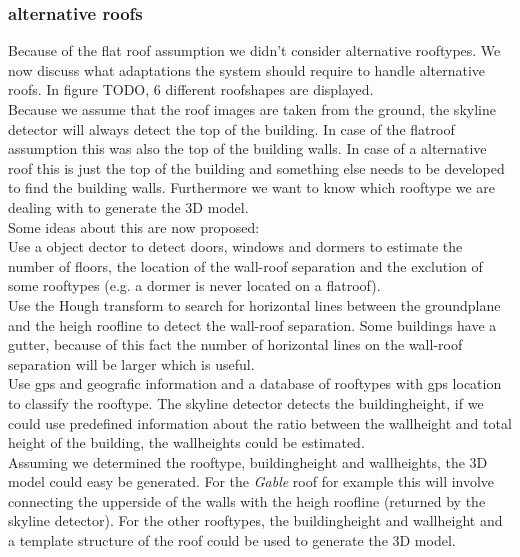 \documentclass[10pt]{article}
\begin{document}
\subsubsection{alternative roofs}


Because of the flat roof assumption we didn't consider alternative rooftypes.
We now discuss what adaptations the system should require to handle alternative roofs.
In figure TODO, 6 different roofshapes are displayed.\\
Because we assume that the roof images are taken from the ground, the skyline
detector will always detect the top of the building. In case of the flatroof
assumption this was also the top of the building walls.
In case of a alternative roof this is just the top of the building and something
else needs to be developed to find the building walls. Furthermore we want to
know which rooftype we are dealing with to generate the 3D model.\\
Some ideas about this are now proposed:\\
Use a object dector to detect doors, windows and dormers to estimate the
number of floors, the location of the wall-roof separation and the exclution of
some rooftypes (e.g. a dormer is never located on a flatroof).\\
Use the Hough transform to search for horizontal lines between the groundplane and the
heigh roofline to detect the wall-roof separation. Some buildings have a gutter,
because of this fact the number of horizontal lines on the wall-roof separation
will be larger which is useful.\\
Use gps and geografic information and a database of rooftypes with gps location
to classify the rooftype. The skyline detector detects the buildingheight, if we
could use predefined information about the ratio between the wallheight and
total height of the building, the wallheights could be estimated.\\
Assuming we determined the rooftype, buildingheight and wallheights, the 3D model could 
easy be generated. 
For the \emph{Gable} roof for example this will involve connecting the upperside of the
walls with the heigh roofline (returned by the skyline detector). For the other
rooftypes, the buildingheight and wallheight and a template structure of the
roof could be used to generate the 3D model.
\end{document}

